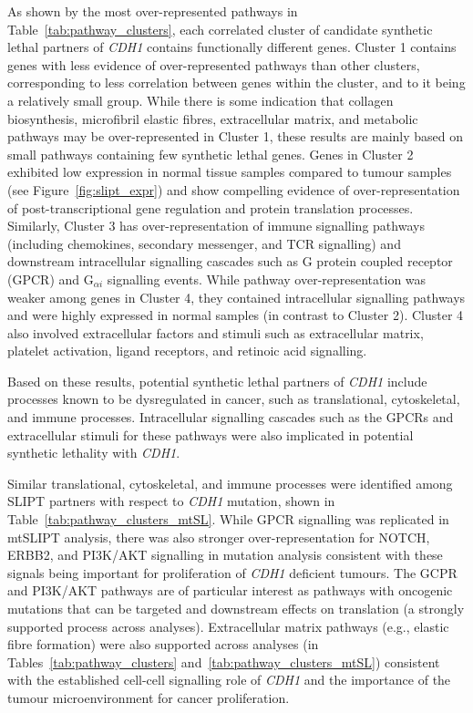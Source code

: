 As shown by the most over-represented pathways in Table~\ref{tab:pathway_clusters}, each correlated cluster of candidate synthetic lethal partners of \textit{CDH1} contains functionally different genes. %
Cluster 1 contains genes with less evidence of over-represented pathways than other clusters, corresponding to less correlation between genes within the cluster, and to it being a relatively small group. While there is some indication that collagen biosynthesis, microfibril elastic fibres, extracellular matrix, and metabolic pathways may be over-represent\-ed in Cluster 1, these results are mainly based on small pathways containing few synthetic lethal genes. Genes in Cluster 2 exhibited low expression in normal tissue samples compared to tumour samples (see Figure~\ref{fig:slipt_expr}) and show compelling evidence of over-represent\-ation of post-transcriptional gene regulation and protein translation processes. Similarly, Cluster 3 has over-represent\-ation of immune signalling pathways (including chemokines, secondary messenger, and TCR signalling) and downstream intracellular signalling cascades such as G protein coupled receptor (GPCR) and  G$_{\alpha i}$ signalling events. While pathway over-represent\-ation was weaker among genes in Cluster 4, they contained intracellular signalling pathways and were highly expressed in normal samples (in contrast to Cluster 2). Cluster 4 also involved extracellular factors and stimuli such as extracellular matrix, platelet activation, ligand receptors, and retinoic acid signalling.

Based on these results, potential synthetic lethal partners of \textit{CDH1} include processes known to be dysregulated in cancer, such as translational, cytoskeletal, and immune processes. Intracellular signalling cascades such as the GPCRs and extracellular stimuli for these pathways were also implicated in potential synthetic lethality with \textit{CDH1}.

Similar translational, cytoskeletal, and immune processes were identified among \gls{SLIPT} partners with respect to \textit{CDH1} mutation, shown in Table~\ref{tab:pathway_clusters_mtSL}. While GPCR signalling was replicated in mtSLIPT analysis, there was also stronger over-representation for NOTCH, ERBB2, and PI3K/AKT signalling in mutation analysis consistent with these signals being important for proliferation of \textit{CDH1} deficient tumours. The GCPR and PI3K/AKT pathways are of particular interest as pathways with oncogenic mutations that can be targeted and downstream effects on translation (a strongly supported process across analyses). Extracellular matrix pathways (e.g., elastic fibre formation) were also supported across analyses (in Tables~\ref{tab:pathway_clusters} and~\ref{tab:pathway_clusters_mtSL}) consistent with the established cell-cell signalling role of \textit{CDH1} and the importance of the tumour microenvironment for cancer proliferation.

